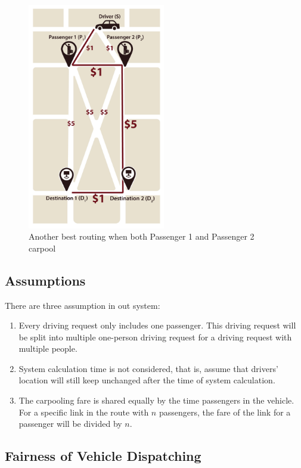 \begin{figure}[htp]
  \centering
  \captionsetup{justification=centering}
  \includegraphics[width=6cm]{figures/mapV2_3.jpg}
  \caption{Another best routing when both Passenger 1 and Passenger 2 carpool}
\end{figure}
\newpage

\subsection{Assumptions}

There are three assumption in out system:

\begin{enumerate}
  \item Every driving request only includes one passenger. This driving request will be split into multiple one-person driving request for a driving request with multiple people.
  \item System calculation time is not considered, that is, assume that drivers' location will still keep unchanged after the time of system calculation.
  \item The carpooling fare is shared equally by the time passengers in the vehicle. For a specific link in the route with $n$ passengers, the fare of the link for a passenger will be divided by $n$.
 \end{enumerate}

\subsection{Fairness of Vehicle Dispatching}

